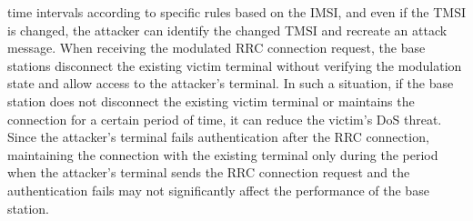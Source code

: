 \documentclass[english]{article}
\begin{document}
time intervals according to specific rules based on the IMSI, and even if the TMSI is changed,
the attacker can identify the changed TMSI and recreate an attack message. When receiving the
modulated RRC connection request, the base stations disconnect the existing victim terminal
without verifying the modulation state and allow access to the attacker's terminal. In such
a situation, if the base station does not disconnect the existing victim terminal or maintains
the connection for a certain period of time, it can reduce the victim's DoS threat. Since the
attacker's terminal fails authentication after the RRC connection, maintaining the connection
with the existing terminal only during the period when the attacker's terminal sends the RRC
connection request and the authentication fails may not significantly affect the performance
of the base station.\\[0.2cm]
\end{document}
